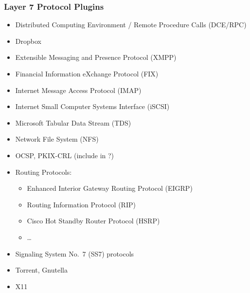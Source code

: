 \documentclass[documentation]{subfiles}
\begin{document}
\subsubsection{Layer 7 Protocol Plugins}

\begin{itemize}
    \item Distributed Computing Environment / Remote Procedure Calls (DCE/RPC)
    \item Dropbox
    \item Extensible Messaging and Presence Protocol (XMPP)
    \item Financial Information eXchange Protocol (FIX)
    \item Internet Message Access Protocol (IMAP)
    \item Internet Small Computer Systems Interface (iSCSI)
    \item Microsoft Tabular Data Stream (TDS)
    \item Network File System (NFS)
    \item OCSP, PKIX-CRL (include in ?)
    \item Routing Protocols:
        \begin{itemize}
            \item Enhanced Interior Gateway Routing Protocol (EIGRP)
            \item Routing Information Protocol (RIP)
            \item Cisco Hot Standby Router Protocol (HSRP)
            \item \ldots
        \end{itemize}
    \item Signaling System No.\ 7 (SS7) protocols
    \item Torrent, Gnutella
    \item X11
\end{itemize}
\end{document}
